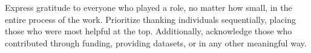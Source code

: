 Express gratitude to everyone who played a role, no matter how small, in the entire process of the work. Prioritize thanking individuals sequentially, placing those who were most helpful at the top. Additionally, acknowledge those who contributed through funding, providing datasets, or in any other meaningful way.